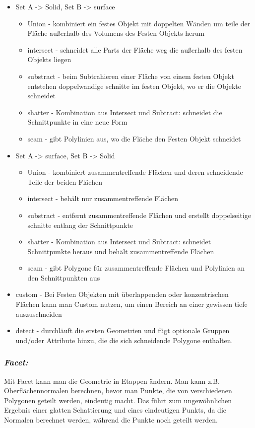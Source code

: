 \documentclass[paper=a4,fontsize=12pt,ngerman]{scrartcl}
\begin{document}
\begin{itemize}
		\item Set A -> Solid, Set B -> surface
		\begin{itemize}
			\item Union - kombiniert ein festes Objekt mit doppelten Wänden um teile der Fläche außerhalb des Volumens des Festen Objekts herum
			\item intersect - schneidet alle Parts der Fläche weg die außerhalb des festen Objekts liegen
			\item substract - beim Subtrahieren einer Fläche von einem festen Objekt entstehen doppelwandige schnitte im festen Objekt, wo er die Objekte schneidet
			\item shatter - Kombination aus Intersect und Subtract: schneidet die Schnittpunkte in eine neue Form
			\item seam - gibt Polylinien aus, wo die Fläche den Festen Objekt schneidet
		\end{itemize}
		\item Set A -> surface, Set B -> Solid
		\begin{itemize}
			\item Union - kombiniert zusammentreffende Flächen und deren schneidende Teile der beiden Flächen
			\item intersect - behält nur zusammentreffende Flächen
			\item substract - entfernt zusammentreffende Flächen und erstellt doppelseitige schnitte entlang der Schnittpunkte
			\item shatter - Kombination aus Intersect und Subtract:  schneidet Schnittpunkte heraus und behält zusammentreffende Flächen 
			\item seam - gibt Polygone für zusammentreffende Flächen und Polylinien an den Schnittpunkten aus 
		\end{itemize}
		\item custom	- Bei Festen Objekten mit überlappenden oder konzentrischen Flächen kann man Custom nutzen, um einen Bereich an einer gewissen tiefe auszuschneiden
		\item detect	- durchläuft die ersten Geometrien und fügt optionale Gruppen und/oder Attribute hinzu, die die sich schneidende Polygone enthalten.
	\end{itemize}
	\subsubsection*{\textit{Facet:}}
	Mit Facet kann man die Geometrie in Etappen ändern. Man kann z.B. Oberflächennormalen berechnen, bevor man Punkte, die von verschiedenen Polygonen geteilt werden, eindeutig macht. Das führt zum ungewöhnlichen Ergebnis einer glatten Schattierung und eines eindeutigen Punkts, da die Normalen berechnet werden, während die Punkte noch geteilt werden. 
\end{document}
